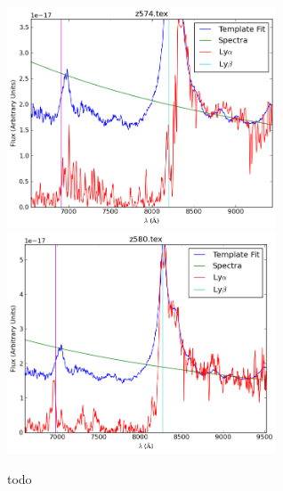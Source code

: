 \documentclass[11pt]{article}
\begin{document}
\begin{figure}[h]
  \includegraphics[width=8cm]{z574.png}
  \includegraphics[width=8cm]{z580.png}
  \caption{todo}
  \label{fig:todo}
\end{figure}
\end{document}
